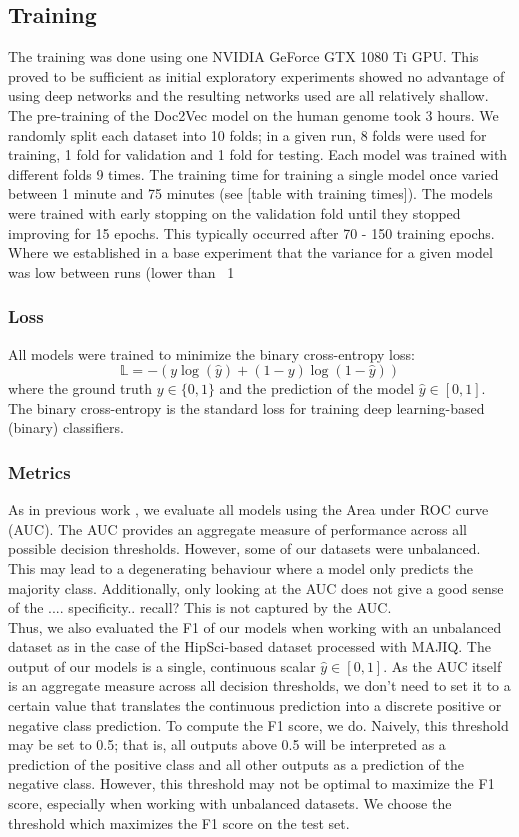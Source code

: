 \subsection{Training} \label{subsec:training_details}
The training was done using one NVIDIA GeForce GTX 1080 Ti GPU. This proved to be sufficient as initial exploratory experiments showed no advantage of using deep networks and the resulting networks used are all relatively shallow. The pre-training of the Doc2Vec model on the human genome took 3 hours. We randomly split each dataset into 10 folds; in a given run, 8 folds were used for training, 1 fold for validation and 1 fold for testing. Each model was trained with different folds 9 times.
The training time for training a single model once varied between 1 minute and 75 minutes (see [table with training times]). The models were trained with early stopping on the validation fold until they stopped improving for 15 epochs. This typically occurred after 70 - 150 training epochs.
Where we established in a base experiment that the variance for a given model was low between runs (lower than ~1%
\subsubsection{Loss}  \label{subsubsec:loss}
All models were trained to minimize the binary cross-entropy loss:
$$\mathbb{L} = - (y \log(\hat{y}) + (1 - y) \log (1 - \hat{y}))$$
where the ground truth $y \in \{0, 1\}$ and the prediction of the model $\hat{y} \in [0, 1]$. The binary cross-entropy is the standard loss for training deep learning-based (binary) classifiers.
\subsubsection{Metrics} \label{subsubsec:metrics}
As in previous work \cite{dsc}, we evaluate all models using the Area under ROC curve (AUC). The AUC provides an aggregate measure of performance across all possible decision thresholds.
However, some of our datasets were unbalanced. This may lead to a degenerating behaviour where a model only predicts the majority class. Additionally, only looking at the AUC does not give a good sense of the .... specificity.. recall?
This is not captured by the AUC. \\
Thus, we also evaluated the F1 of our models when working with an unbalanced dataset as in the case of the HipSci-based dataset processed with MAJIQ.
The output of our models is a single, continuous scalar $\hat{y} \in [0, 1]$. As the AUC itself is an aggregate measure across all decision thresholds, we don't need to set it to a certain value that translates the continuous prediction into a discrete positive or negative class prediction. To compute the F1 score, we do. Naively, this threshold may be set to 0.5; that is, all outputs above 0.5 will be interpreted as a prediction of the positive class and all other outputs as a prediction of the negative class. However, this threshold may not be optimal to maximize the F1 score, especially when working with unbalanced datasets. We choose the threshold which maximizes the F1 score on the test set.



